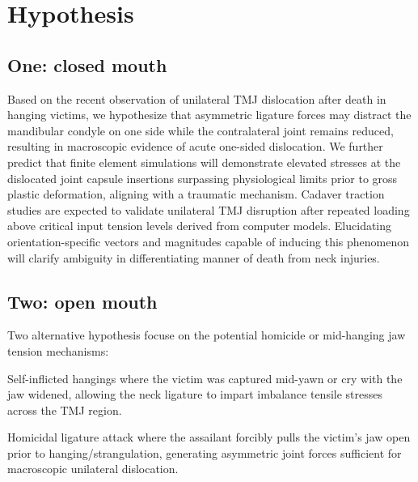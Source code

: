 \documentclass{article}
\begin{document}
\section{Hypothesis}

\subsection{One: closed mouth}
Based on the recent observation of unilateral TMJ dislocation after death in hanging victims, we hypothesize that asymmetric ligature forces may distract the mandibular condyle on one side while the contralateral joint remains reduced, resulting in macroscopic evidence of acute one-sided dislocation. 
We further predict that finite element simulations will demonstrate elevated stresses at the dislocated joint capsule insertions surpassing physiological limits prior to gross plastic deformation, aligning with a traumatic mechanism. 
Cadaver traction studies are expected to validate unilateral TMJ disruption after repeated loading above critical input tension levels derived from computer models. 
Elucidating orientation-specific vectors and magnitudes capable of inducing this phenomenon will clarify ambiguity in differentiating manner of death from neck injuries.

\subsection{Two: open mouth}
Two alternative hypothesis focuse on the potential homicide or mid-hanging jaw tension mechanisms:

\begin{outline}

\1 Self-inflicted hangings where the victim was captured mid-yawn or cry with the jaw widened, allowing the neck ligature to impart imbalance tensile stresses across the TMJ region.

\1 Homicidal ligature attack where the assailant forcibly pulls the victim’s jaw open prior to hanging/strangulation, generating asymmetric joint forces sufficient for macroscopic unilateral dislocation.

\end{outline}
\end{document}
